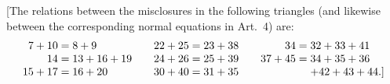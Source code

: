 [The relations between the misclosures in the following triangles (and likewise between the corresponding normal equations in Art.~4) are:
\[
\begin{array}{r@{\;}c@{\;}l@{\qquad}r@{\;}c@{\;}l@{\qquad}r@{\;}c@{\;}l}
7+10&=&8+9&22+25&=&23+38&34&=&32+33+41\\
14&=&13+16+19&24+26&=&25+39&37+45&=&34+35+36\\
15+17&=&16+20&30+40&=&31+35&&&+42+43+44.\text{]}
\end{array}
\]
\endgroup
